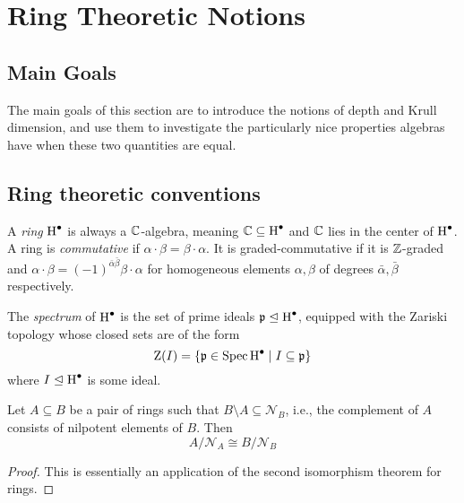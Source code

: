 \chapter{Ring Theoretic Notions}
\label{chap:ag-git}

\section{Main Goals}
\label{sec:ageom-goals}

The main goals of this section are to introduce the notions of depth and Krull dimension, and use them to investigate the particularly nice properties algebras have when these two quantities are equal.

\section{Ring theoretic conventions}
\label{sec:rings}

\begin{definition}
  A \emph{ring} $\operatorname{H}^\bullet$ is always a $\mathbb{C}$-algebra, meaning $\mathbb{C} \subseteq \operatorname{H}^\bullet$ and $\mathbb{C}$ lies in the center of $\operatorname{H}^\bullet$. A ring is \emph{commutative} if $\alpha \cdot \beta = \beta \cdot \alpha$. It is graded-commutative if it is $\mathbb{Z}$-graded and $\alpha \cdot \beta = (-1)^{\bar \alpha \bar \beta} \beta \cdot \alpha$ for homogeneous elements $\alpha, \beta$ of degrees $\bar \alpha, \bar \beta$ respectively.
\end{definition}

\begin{definition}
  The \emph{spectrum} of $\operatorname{H}^\bullet$ is the set of prime ideals $\mathfrak{p} \trianglelefteq \operatorname{H}^\bullet$, equipped with the Zariski topology whose closed sets are of the form
  \[
    \operatorname{Z}(I) = \left\{ \mathfrak{p} \in \operatorname{Spec} \operatorname{H}^\bullet \mid I \subseteq \mathfrak{p} \right\}
  \]
  where $I \trianglelefteq \operatorname{H}^\bullet$ is some ideal.
\end{definition}

\begin{proposition} \label{prop:iso-2}
  Let $A \subseteq B$ be a pair of rings such that $B \setminus A \subseteq \mathcal{N}_B$, i.e., the complement of $A$ consists of nilpotent elements of $B$. Then \[A / \mathcal{N}_A \cong B / \mathcal{N}_B\]
\end{proposition}
\begin{proof}
  This is essentially an application of the second isomorphism theorem for rings.
\end{proof}


